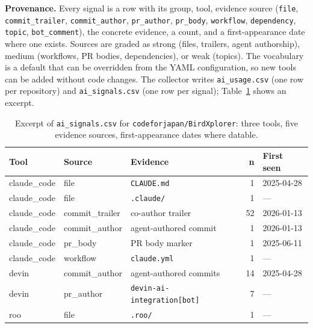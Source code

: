 \documentclass[10pt,conference]{IEEEtran}
\begin{document}
\textbf{Provenance.} Every signal is a row with its group, tool, evidence source (\texttt{file}, \texttt{commit\_trailer}, \texttt{commit\_author}, \texttt{pr\_author}, \texttt{pr\_body}, \texttt{workflow}, \texttt{dependency}, \texttt{topic}, \texttt{bot\_comment}), the concrete evidence, a count, and a first-appearance date where one exists. Sources are graded as strong (files, trailers, agent authorship), medium (workflows, PR bodies, dependencies), or weak (topics). The vocabulary is a default that can be overridden from the YAML configuration, so new tools can be added without code changes. The collector writes \texttt{ai\_usage.csv} (one row per repository) and \texttt{ai\_signals.csv} (one row per signal); Table~\ref{tab:ai} shows an excerpt.

\begin{table}[t]
  \centering
  \caption{Excerpt of \texttt{ai\_signals.csv} for \texttt{codeforjapan/BirdXplorer}: three tools, five evidence sources, first-appearance dates where datable.}
  \label{tab:ai}
  \scriptsize
  \setlength{\tabcolsep}{3pt}
  \begin{tabularx}{\columnwidth}{@{}llXrl@{}}
    \toprule
    \textbf{Tool} & \textbf{Source} & \textbf{Evidence} & \textbf{n} & \textbf{First seen} \\
    \midrule
    claude\_code & file            & \texttt{CLAUDE.md}                 & 1  & 2025-04-28 \\
    claude\_code & file            & \texttt{.claude/}                  & 1  & --- \\
    claude\_code & commit\_trailer & co-author trailer                  & 52 & 2026-01-13 \\
    claude\_code & commit\_author  & agent-authored commit              & 1  & 2026-01-13 \\
    claude\_code & pr\_body        & PR body marker                     & 1  & 2025-06-11 \\
    claude\_code & workflow        & \texttt{claude.yml}                & 1  & --- \\
    devin        & commit\_author  & agent-authored commits             & 14 & 2025-04-28 \\
    devin        & pr\_author      & \texttt{devin-ai-\allowbreak integration[bot]} & 7  & --- \\
    roo          & file            & \texttt{.roo/}                     & 1  & --- \\
    \bottomrule
  \end{tabularx}
\end{table}
\end{document}
